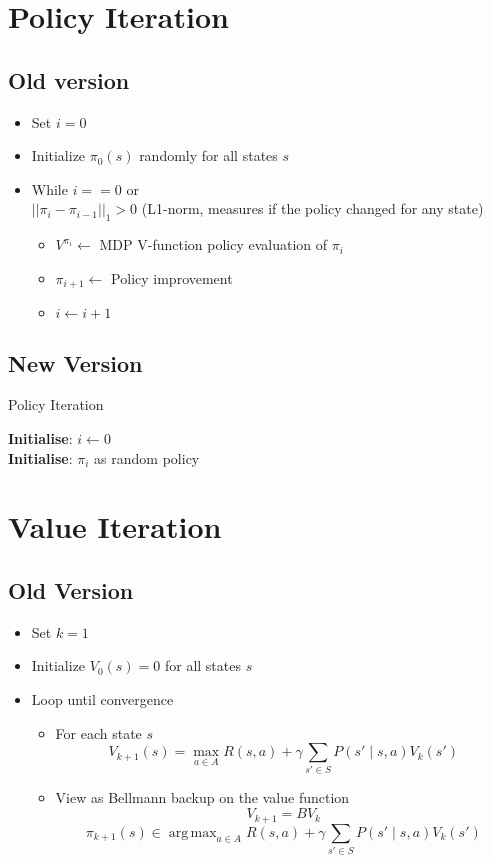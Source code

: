 \documentclass[11pt,a4paper,ngerman]{article}
\DeclareMathOperator*{\argmax}{arg\,max}
\begin{document}
\section{Policy Iteration}
\subsection{Old version}
\begin{itemize}
	\item Set $i=0$
	\item Initialize $\pi_0(s)$ randomly for all states $s$
	\item While $i == 0$ or\\ $||\pi_i - \pi_{i-1}||_1 > 0$ (L1-norm, measures if the policy changed for any state)
	\begin{itemize}
		\item $V^{\pi_i} \gets$ MDP V-function policy evaluation of $\pi_i$
		\item $\pi_{i+1} \gets$ Policy improvement
		\item $i \gets i+1$
	\end{itemize}
\end{itemize}
\subsection{New Version}

\begin{algorithm}[H]
  \caption{Policy Iteration}
  \DontPrintSemicolon
  \textbf{Initialise}: $i \leftarrow 0$\\
  \textbf{Initialise}: $\pi_i$ as random policy\\
\end{algorithm}

\newpage

\section{Value Iteration}
\subsection{Old Version}
\begin{itemize}
	\item  Set $k = 1$
	\item Initialize $V_0(s) = 0$ for all states $s$
	\item Loop until convergence
	\begin{itemize}
		\item For each state $s$
		$$V_{k+1}(s) = \max_{a\in A } R(s,a) + \gamma \sum_{s' \in S } P(s' \mid s,a) V_k(s') $$
		\item View as Bellmann backup on the value function
		$$V_{k+1} = BV_k$$
		$$\pi_{k+1}(s) \in \argmax_{a \in A} R(s,a) + \gamma \sum_{s' \in S} P(s' \mid s,a) V_k(s') $$
	\end{itemize}
\end{itemize}
\end{document}
